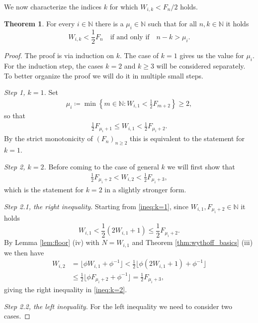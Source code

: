 \documentclass[]{interact}
\newcommand{\bbN}{\mathbb{N}}
\theoremstyle{definition}
\newtheorem{thm}{Theorem}[section]
\numberwithin{table}{section} %
\numberwithin{figure}{section}
\begin{document}
We now characterize the indices $k$ for which $W_{i, k} < F_n/2$ holds.

\begin{thm} \label{thm:const_shift}
	For every $i \in \bbN$ there is a $\mu_i \in \bbN$ such that for all $n, k \in \bbN$ it holds
	$$
	W_{i, k} < \frac12 F_n \quad \text{if and only if} \quad n-k > \mu_i.
	$$
\end{thm}
\begin{proof}
    The proof is via induction on $k$. The case of $k=1$ gives us the value for $\mu_i$. For the induction step, the cases $k=2$ and $k \geq 3$ will be considered separately. To better organize the proof we will do it in multiple small steps.

    \textit{Step 1, $k=1$.} Set
    \begin{align} \label{mu_i}
        \mu_i \coloneqq \min\left\{m \in \bbN: W_{i, 1} < \frac12 F_{m+2}\right\} \geq 2,
    \end{align}
    so that
    \begin{align} \label{ineq:k=1}
        \frac12 F_{\mu_i+1} \leq W_{i, 1} < \frac12 F_{\mu_i+2}.
    \end{align}
    By the strict monotonicity of $(F_n)_{n \geq 2}$ this is equivalent to the statement for $k=1$.

    \textit{Step 2, $k=2$.} Before coming to the case of general $k$ we will first show that
    \begin{align} \label{ineq:k=2}
        \frac12 F_{\mu_i+2} < W_{i, 2} < \frac12 F_{\mu_i+3},
    \end{align}
    which is the statement for $k=2$ in a slightly stronger form.

    \textit{Step 2.1, the right inequality.} Starting from \eqref{ineq:k=1}, since $W_{i, 1}, F_{\mu_i+2} \in \bbN$ it holds
    $$
    W_{i, 1} < \frac12(2W_{i, 1}+1) \leq \frac12 F_{\mu_i+2}.
    $$
    By Lemma \ref{lem:floor} (iv) with $N=W_{i, 1}$ and Theorem \ref{thm:wythoff_basics} (iii) we then have
    \begin{align*}
        W_{i, 2} & = \lfloor \phi W_{i, 1} + \phi^{-1}\rfloor < \frac12 \lfloor \phi (2W_{i, 1}+1) + \phi^{-1}\rfloor \\
        & \leq \frac12 \lfloor \phi F_{\mu_i+2} + \phi^{-1}\rfloor = \frac12 F_{\mu_i+3},
    \end{align*}
    giving the right inequality in \eqref{ineq:k=2}.

    \textit{Step 2.2, the left inequality.} For the left inequality we need to consider two cases.


\end{proof}
\end{document}
